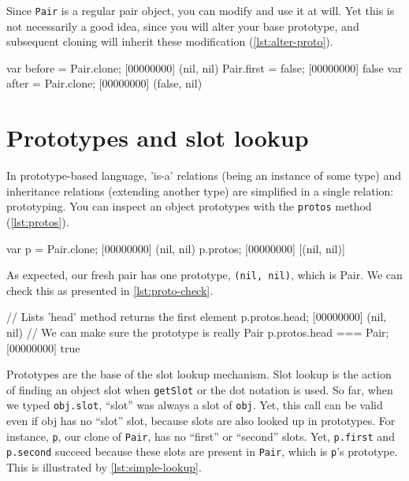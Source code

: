 \documentclass[openright,twoside,12pt]{report}
\begin{document}
Since \lstinline|Pair| is a regular pair object, you can modify and
use it at will. Yet this is not necessarily a good idea, since you
will alter your base prototype, and subsequent cloning will inherit
these modification (\autoref{lst:alter-proto}).

\begin{urbiscript}[caption=Altering a prototype, label=lst:alter-proto]
var before = Pair.clone;
[00000000] (nil, nil)
Pair.first = false;
[00000000] false
var after = Pair.clone;
[00000000] (false, nil)
\end{urbiscript}

\section{Prototypes and slot lookup}

In prototype-based language, 'is-a' relations (being an instance of
some type) and inheritance relations (extending another type) are
simplified in a single relation: prototyping. You can inspect an
object prototypes with the \texttt{protos} method (\autoref{lst:protos}).

\begin{urbiscript}[caption=Inspecting prototypes, label=lst:protos,
  name=protos]
var p = Pair.clone;
[00000000] (nil, nil)
p.protos;
[00000000] [(nil, nil)]
\end{urbiscript}

As expected, our fresh pair has one prototype, \lstinline|(nil, nil)|,
which is Pair. We can check this as presented in \autoref{lst:proto-check}.

\begin{urbiscript}[caption=Checking the prototype,
  label=lst:proto-check, name=protos]
// Lists 'head' method returns the first element
p.protos.head;
[00000000] (nil, nil)
// We can make sure the prototype is really Pair
p.protos.head === Pair;
[00000000] true
\end{urbiscript}

Prototypes are the base of the slot lookup mechanism. Slot lookup is
the action of finding an object slot when \texttt{getSlot} or the dot
notation is used. So far, when we typed \lstinline|obj.slot|, ``slot''
was always a slot of \lstinline|obj|.
Yet, this call can be valid even if obj has
no ``slot'' slot, because slots are also looked up in prototypes. For
instance, \lstinline|p|, our clone of \lstinline|Pair|, has no
``first'' or ``second'' slots. Yet, \lstinline|p.first| and
\lstinline|p.second| succeed because these slots are present in
\lstinline|Pair|, which is \lstinline|p|'s prototype. This is
illustrated by \autoref{lst:simple-lookup}.
\end{document}
